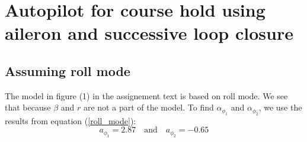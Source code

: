 \section{Autopilot for course hold using aileron and successive
loop closure}

\subsection{Assuming roll mode}

The model in figure (1) in the assignement text is based on roll mode. We see that because $\beta$ and $r$ are not a part of the model. To find $\alpha_\phi_1$ and $\alpha_\phi_2$, we use the results from equation (\ref{roll_mode}):
\begin{equation*}
    a_{\phi_1} = 2.87 \quad \text{and} \quad a_{\phi_2} = -0.65
\end{equation*}